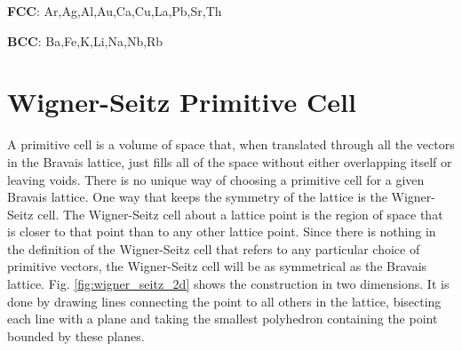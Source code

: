 \documentclass{Textbook}
\begin{document}
\textbf{FCC}: Ar,Ag,Al,Au,Ca,Cu,La,Pb,Sr,Th 

\textbf{BCC}: Ba,Fe,K,Li,Na,Nb,Rb

\section{Wigner-Seitz Primitive Cell}
A primitive cell is a volume of space that, when translated through all the vectors in the Bravais lattice, just fills all of the space without either overlapping itself or leaving voids. There is no unique way of choosing a primitive cell for a given Bravais lattice. One way that keeps the symmetry of the lattice is the Wigner-Seitz cell.\nl
The Wigner-Seitz cell about a lattice point is the region of space that is closer to that point than to any other lattice point. Since there is nothing in the definition of the Wigner-Seitz cell that refers to any particular choice of primitive vectors, the Wigner-Seitz cell will be as symmetrical as the Bravais lattice. Fig. \ref{fig:wigner_seitz_2d} shows the construction in two dimensions. It is done by drawing lines connecting the point to all others in the lattice, bisecting each line with a plane and taking the smallest polyhedron containing the point bounded by these planes. 
\end{document}
